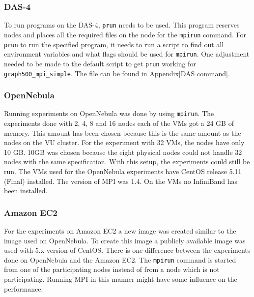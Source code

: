 \subsubsection*{DAS-4}
To run programs on the DAS-4, \texttt{prun} needs to be used. This program reserves nodes and places all the required files on the node for the \texttt{mpirun} command. For \texttt{prun} to run the specified program, it needs to run a script to find out all environment variables and what flags should be used for \texttt{mpirun}. One adjustment needed to be made to the default script to get \texttt{prun} working for \texttt{graph500\_mpi\_simple}. The file can be found in Appendix[DAS command].

\subsubsection*{OpenNebula}
Running experiments on OpenNebula was done by using \texttt{mpirun}. The experiments done with 2, 4, 8 and 16 nodes each of the VMs got a 24 GB of memory. This amount has been chosen because this is the same amount as the nodes on the VU cluster. For the experiment with 32 VMs, the nodes have only 10 GB. 10GB was chosen because the eight physical nodes could not handle 32 nodes with the same specification. With this setup, the experiments could still be run. The VMs used for the OpenNebula experiments have CentOS release 5.11 (Final) installed. The version of MPI was 1.4. On the VMs no InfiniBand has been installed.

\subsubsection*{Amazon EC2}
For the experiments on Amazon EC2 a new image was created similar to the image used on OpenNebula. To create this image a publicly available image was used with 5.x version of CentOS. There is one difference between the experiments done on OpenNebula and the Amazon EC2. The \texttt{mpirun} command is started from one of the participating nodes instead of from a node which is not participating. Running MPI in this manner might have some influence on the performance.
